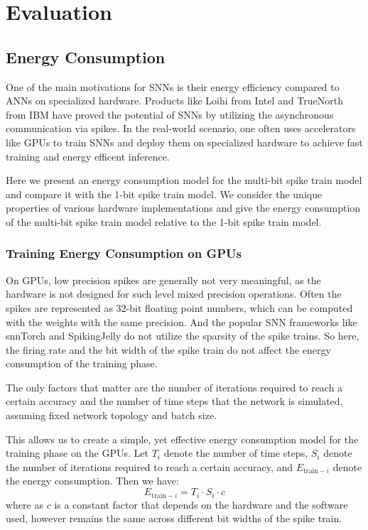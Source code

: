 \chapter{Evaluation}
\label{chap:evaluation}

\section{Energy Consumption}
\label{sec:energy-consumption}
    One of the main motivations for SNNs is their energy efficiency compared to ANNs on specialized hardware. Products like Loihi from Intel \cite{8259423} and TrueNorth from IBM \cite{7229264} have proved the potential of SNNs by utilizing the asynchronous communication via spikes. In the real-world scenario, one often uses accelerators like GPUs to train SNNs and deploy them on specialized hardware to achieve fast training and energy efficent inference. 

    Here we present an energy consumption model for the multi-bit spike train model and compare it with the 1-bit spike train model. We consider the unique properties of various hardware implementations and give the energy consumption of the multi-bit spike train model relative to the 1-bit spike train model. 

    \subsection{Training Energy Consumption on GPUs}
    \label{subsec:training_energy}
        On GPUs, low precision spikes are generally not very meaningful, as the hardware is not designed for such level mixed precision operations. Often the spikes are represented as 32-bit floating point numbers, which can be computed with the weights with the same precision. And the popular SNN frameworks like snnTorch and SpikingJelly do not utilize the sparsity of the spike trains. So here, the firing rate and the bit width of the spike train do not affect the energy consumption of the training phase. 
    
        The only factors that matter are the number of iterations required to reach a certain accuracy and the number of time steps that the network is simulated, assuming fixed network topology and batch size. 
    
        This allows us to create a simple, yet effective energy consumption model for the training phase on the GPUs. Let $T_i$ denote the number of time steps, $S_i$ denote the number of iterations required to reach a certain accuracy, and $E_{\text{train}-i}$ denote the energy consumption. Then we have:
        \begin{equation}
            E_{\text{train}-i} = T_i \cdot S_i \cdot c
        \end{equation}
        where as $c$ is a constant factor that depends on the hardware and the software used, however remains the same across different bit widths of the spike train. 
    
